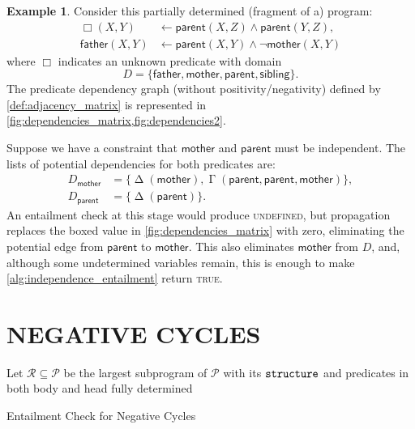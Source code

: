 \documentclass[letterpaper]{article}
\theoremstyle{definition}
\newtheorem{example}{Example}
\newcommand{\variable}[1]{\texttt{\textup{#1}}}
\DeclareMathOperator{\Determined}{\Delta}
\DeclareMathOperator{\AlmostDetermined}{\Gamma}
\begin{document}
\begin{example} \label{example:independence}
  Consider this partially determined (fragment of a) program:
  \begin{align*}
    \Box(X, Y) &\gets \mathsf{parent}(X, Z) \land \mathsf{parent}(Y, Z),\\
    \mathsf{father}(X, Y) &\gets \mathsf{parent}(X, Y) \land \neg\mathsf{mother}(X, Y)
  \end{align*}
  where $\Box$ indicates an unknown predicate with domain
  \[
    D = \{ \mathsf{father}, \mathsf{mother}, \mathsf{parent}, \mathsf{sibling}
    \}.
  \]
  The predicate dependency graph (without positivity/negativity) defined by
  \cref{def:adjacency_matrix} is represented in
  \cref{fig:dependencies_matrix,fig:dependencies2}.

  Suppose we have a constraint that $\mathsf{mother}$ and $\mathsf{parent}$ must
  be independent. The lists of potential dependencies for both predicates are:
  \begin{align*}
    D_{\mathsf{mother}} &= \{ \Determined(\mathsf{mother}), \AlmostDetermined(\mathsf{parent}, \mathsf{parent}, \mathsf{mother}) \}, \\
    D_{\mathsf{parent}} &= \{ \Determined(\mathsf{parent}) \}.
  \end{align*}
  An entailment check at this stage would produce \textsc{undefined}, but
  propagation replaces the boxed value in \cref{fig:dependencies_matrix} with
  zero, eliminating the potential edge from $\mathsf{parent}$ to
  $\mathsf{mother}$. This also eliminates $\mathsf{mother}$ from $D$, and,
  although some undetermined variables remain, this is enough to make
  \cref{alg:independence_entailment} return \textsc{true}.
\end{example}

\section{NEGATIVE CYCLES}

\begin{algorithm}
  Let $\mathscr{R} \subseteq \mathscr{P}$ be the largest subprogram of
  $\mathscr{P}$ with its $\variable{structure}$ and predicates in both body
  and head fully determined\footnotemark\;
  \;
  \caption{Entailment Check for Negative Cycles}
  \label{alg:negative_cycles}
\end{algorithm}
\end{document}

